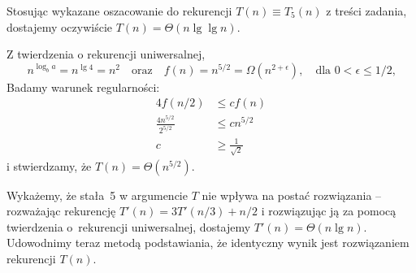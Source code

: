 % 

Stosując wykazane oszacowanie do rekurencji $T(n)\equiv T_5(n)$ z treści zadania, dostajemy oczywiście $T(n)=\Theta(n\lg\lg n)$.

\subexercise{} %
Z twierdzenia o rekurencji uniwersalnej,
\[
	n^{\log_ba} = n^{\lg4} = n^2 \quad\text{oraz}\quad f(n) = n^{5/2} = \Omega(n^{2+\epsilon}), \quad\text{dla $0<\epsilon\le1/2$,}
\]
Badamy warunek regularności:
\begin{align*}
	4f(n/2) &\le cf(n) \\
	\frac{4n^{5/2}}{2^{5/2}} &\le cn^{5/2} \\
	c &\ge \frac{1}{\sqrt{2}}
\end{align*}
i stwierdzamy, że $T(n)=\Theta(n^{5/2})$.

\subexercise{} %
Wykażemy, że stała~5 w argumencie $T$ nie wpływa na postać rozwiązania -- rozważając rekurencję $T'(n)=3T'(n/3)+n/2$ i rozwiązując ją za pomocą twierdzenia o~rekurencji uniwersalnej, dostajemy $T'(n)=\Theta(n\lg n)$. Udowodnimy teraz metodą podstawiania, że identyczny wynik jest rozwiązaniem rekurencji $T(n)$.

